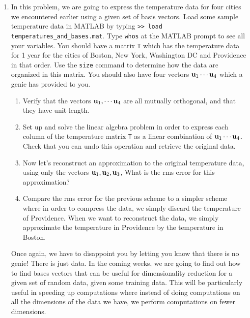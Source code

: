 \begin{prob}
\begin{enumerate}

\item In this problem, we are going to express the temperature data for four cities we encountered earlier using a given set of basis vectors. Load some sample temperature data in MATLAB by typing \texttt{>> load  temperatures\_and\_bases.mat}. Type \texttt{whos} at the MATLAB prompt to see all your variables. You should have a matrix \texttt{T} which has the temperature data for 1 year for the cities of Boston, New York, Washington DC and Providence in that order. Use the \texttt{size} command to determine how the data are organized in this matrix. You should also have four vectors $\mathbf{u}_1\cdots\mathbf{u}_4$ which a genie has provided to you.

\begin{enumerate}

\item Verify that the vectors $\mathbf{u}_1, \cdots \mathbf{u}_4$ are all mutually orthogonal, and that they have unit length.

\item Set up and solve the linear algebra problem in order to express each column of the temperature matrix \texttt{T} as a linear combination of $\mathbf{u}_1\cdots\mathbf{u}_4$. Check that you can undo this operation and retrieve the original data.

\item Now let's reconstruct an approximation to the original temperature data, using only the vectors $\mathbf{u}_1, \mathbf{u}_2, \mathbf{u}_3$, What is the rms error for this approximation?

\item Compare the rms error for the previous scheme to a simpler scheme where in order to compress the data, we simply discard the temperature of Providence. When we want to reconstruct the data, we simply approximate the temperature in Providence by the temperature in Boston.

\end{enumerate}

Once again, we have to disappoint you by letting you know that there is no genie! There is just data. In the coming weeks, we are going to find out how to find bases vectors that can be useful for dimensionality reduction for a given set of random data, given some training data. This will be particularly useful in speeding up computations where instead of doing computations on all the dimensions of the data we have, we perform computations on fewer dimensions.


\end{enumerate}
\end{prob}
